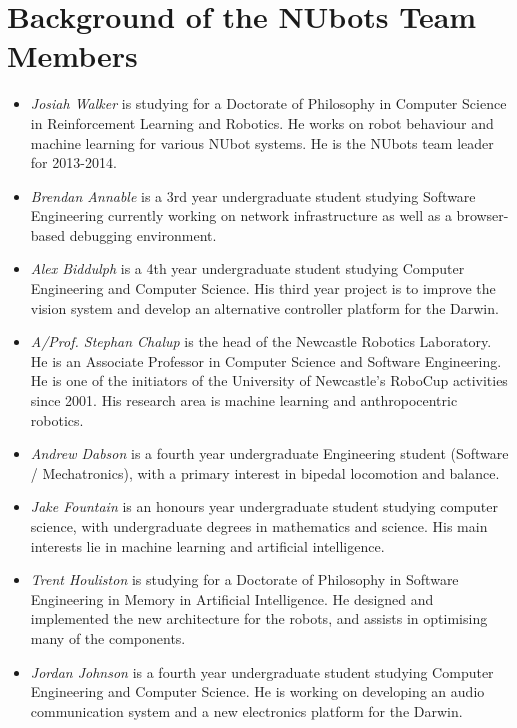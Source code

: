 \documentclass{llncs}
\begin{document}
\section{Background of the NUbots Team Members}
\begin{itemize}
\item \emph{Josiah Walker} is studying for a Doctorate of Philosophy in Computer Science in Reinforcement Learning and Robotics. He works on robot behaviour and machine learning for various NUbot systems. He is the NUbots team leader for 2013-2014.

\item \emph{Brendan Annable} is a 3rd year undergraduate student studying Software Engineering currently working on network infrastructure as well as a browser-based debugging environment.

\item \emph{Alex Biddulph} is a 4th year undergraduate student studying Computer Engineering and Computer Science. His third year project is to improve the vision system and develop an alternative controller platform for the Darwin.

\item \emph{A/Prof. Stephan Chalup} is the head of the Newcastle Robotics
Laboratory. He is an Associate Professor in Computer Science and Software Engineering.
He is one of the initiators of the University of Newcastle's
RoboCup activities since 2001. His research area is machine learning
and anthropocentric robotics.

\item \emph{Andrew Dabson} is a fourth year undergraduate Engineering student (Software / Mechatronics), with a primary interest in bipedal locomotion and balance.

\item \emph{Jake Fountain} is an honours year undergraduate student studying computer science, with undergraduate degrees in mathematics and science. His main interests lie in machine learning and artificial intelligence.

\item \emph{Trent Houliston} is studying for a Doctorate of Philosophy in Software Engineering in Memory in Artificial Intelligence. He designed and implemented the new architecture for the robots, and assists in optimising many of the components.

\item \emph{Jordan Johnson} is a fourth year undergraduate student studying Computer Engineering and Computer Science. He is working on developing an audio communication system and a new electronics platform for the Darwin.


\end{itemize}
\end{document}
